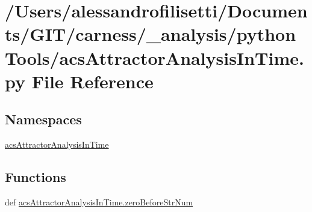 \hypertarget{a00040}{\section{/\-Users/alessandrofilisetti/\-Documents/\-G\-I\-T/carness/\-\_\-analysis/python\-Tools/acs\-Attractor\-Analysis\-In\-Time.py File Reference}
\label{a00040}
}
\subsection*{Namespaces}
\begin{DoxyCompactItemize}
\item 
\hyperlink{a00123}{acs\-Attractor\-Analysis\-In\-Time}
\end{DoxyCompactItemize}
\subsection*{Functions}
\begin{DoxyCompactItemize}
\item 
def \hyperlink{a00123_a52efd37e3719214b7a4c7c46842ae229}{acs\-Attractor\-Analysis\-In\-Time.\-zero\-Before\-Str\-Num}
\end{DoxyCompactItemize}
